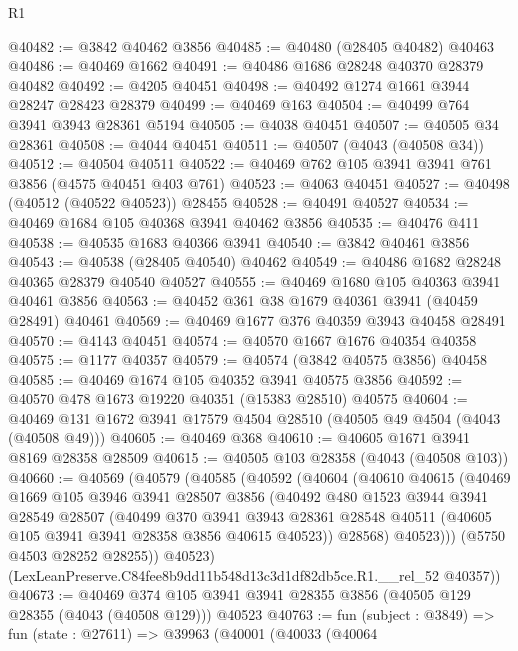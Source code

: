\begin{lexlean}{R1}
\begin{coremodule}
@40482 := @3842 @40462 @3856
@40485 := @40480 (@28405 @40482) @40463
@40486 := @40469 @1662
@40491 := @40486 @1686 @28248 @40370 @28379 @40482
@40492 := @4205 @40451
@40498 := @40492 @1274 @1661 @3944 @28247 @28423 @28379
@40499 := @40469 @163
@40504 := @40499 @764 @3941 @3943 @28361 @5194
@40505 := @4038 @40451
@40507 := @40505 @34 @28361
@40508 := @4044 @40451
@40511 := @40507 (@4043 (@40508 @34))
@40512 := @40504 @40511
@40522 := @40469 @762 @105 @3941 @3941 @761 @3856 (@4575 @40451 @403 @761)
@40523 := @4063 @40451
@40527 := @40498 (@40512 (@40522 @40523)) @28455
@40528 := @40491 @40527
@40534 := @40469 @1684 @105 @40368 @3941 @40462 @3856
@40535 := @40476 @411
@40538 := @40535 @1683 @40366 @3941
@40540 := @3842 @40461 @3856
@40543 := @40538 (@28405 @40540) @40462
@40549 := @40486 @1682 @28248 @40365 @28379 @40540 @40527
@40555 := @40469 @1680 @105 @40363 @3941 @40461 @3856
@40563 := @40452 @361 @38 @1679 @40361 @3941 (@40459 @28491) @40461
@40569 := @40469 @1677 @376 @40359 @3943 @40458 @28491
@40570 := @4143 @40451
@40574 := @40570 @1667 @1676 @40354 @40358
@40575 := @1177 @40357
@40579 := @40574 (@3842 @40575 @3856) @40458
@40585 := @40469 @1674 @105 @40352 @3941 @40575 @3856
@40592 := @40570 @478 @1673 @19220 @40351 (@15383 @28510) @40575
@40604 := @40469 @131 @1672 @3941 @17579 @4504 @28510 (@40505 @49 @4504 (@4043 (@40508 @49)))
@40605 := @40469 @368
@40610 := @40605 @1671 @3941 @8169 @28358 @28509
@40615 := @40505 @103 @28358 (@4043 (@40508 @103))
@40660 := @40569
    (@40579
      (@40585
        (@40592
          (@40604
            (@40610
              @40615
              (@40469
                @1669
                @105
                @3946
                @3941
                @28507
                @3856
                (@40492
                  @480
                  @1523
                  @3944
                  @3941
                  @28549
                  @28507
                  (@40499
                    @370
                    @3941
                    @3943
                    @28361
                    @28548
                    @40511
                    (@40605 @105 @3941 @3941 @28358 @3856 @40615 @40523))
                  @28568)
                @40523)))
          (@5750 @4503 @28252 @28255))
        @40523)
      (LexLeanPreserve.C84fee8b9dd11b548d13c3d1df82db5ce.R1.__rel_52 @40357))
@40673 := @40469
    @374
    @105
    @3941
    @3941
    @28355
    @3856
    (@40505 @129 @28355 (@4043 (@40508 @129)))
    @40523
@40763 := fun (subject : @3849) =>
  fun (state : @27611) =>
  @39963
    (@40001
      (@40033
        (@40064

\end{coremodule}
\end{lexlean}

